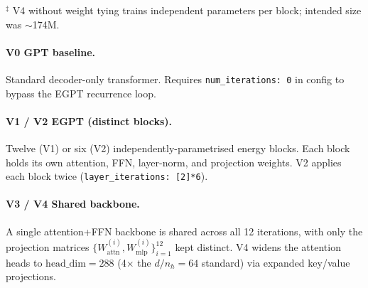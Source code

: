 \documentclass[11pt,a4paper]{article}
\begin{document}
\begin{table}[h]
\centering
\caption{Model variants in the 160M-scale multi-block ablation.
  ``Shared backbone'' ties the attention, FFN, and layer-norm weights across all 12 blocks
  (only $\mathrm{proj\_attn}$/$\mathrm{proj\_mlp}$ remain independent).}
\label{tab:variants}
{\footnotesize $^\ddagger$ V4 without weight tying trains independent parameters per block; intended size was $\sim$174M.}
\end{table}

\paragraph{V0 GPT baseline.}
Standard decoder-only transformer.
Requires \texttt{num\_iterations: 0} in config to bypass the EGPT recurrence loop.

\paragraph{V1 / V2 EGPT (distinct blocks).}
Twelve (V1) or six (V2) independently-parametrised energy blocks.
Each block holds its own attention, FFN, layer-norm, and projection weights.
V2 applies each block twice (\texttt{layer\_iterations: [2]*6}).

\paragraph{V3 / V4 Shared backbone.}
A single attention+FFN backbone is shared across all 12 iterations, with only the
projection matrices $\{W^{(i)}_{\mathrm{attn}}, W^{(i)}_{\mathrm{mlp}}\}_{i=1}^{12}$
kept distinct.
V4 widens the attention heads to $\mathrm{head\_dim} = 288$ (4$\times$ the $d/n_h = 64$
standard) via expanded key/value projections.
\end{document}
